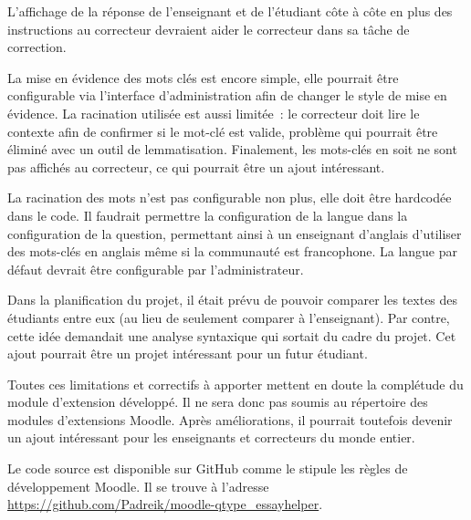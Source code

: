 \begin{conclusion}

L'affichage de la réponse de l'enseignant et de l'étudiant côte à côte en plus des instructions au correcteur devraient aider le correcteur dans sa tâche de correction.

La mise en évidence des mots clés est encore simple, elle pourrait être configurable via l'interface d'administration afin de changer le style de mise en évidence.
La racination utilisée est aussi limitée~: le correcteur doit lire le contexte afin de confirmer si le mot-clé est valide, problème qui pourrait être éliminé avec un outil de lemmatisation.
Finalement, les mots-clés en soit ne sont pas affichés au correcteur, ce qui pourrait être un ajout intéressant.

La racination des mots n'est pas configurable non plus, elle doit être \og hardcodée \fg{} dans le code.
Il faudrait permettre la configuration de la langue dans la configuration de la question, permettant ainsi à un enseignant d'anglais d'utiliser des mots-clés en anglais même si la communauté est francophone.
La langue par défaut devrait être configurable par l'administrateur.

Dans la planification du projet, il était prévu de pouvoir comparer les textes des étudiants entre eux (au lieu de seulement comparer à l'enseignant).
Par contre, cette idée demandait une analyse syntaxique qui sortait du cadre du projet.
Cet ajout pourrait être un projet intéressant pour un futur étudiant.

Toutes ces limitations et correctifs à apporter mettent en doute la complétude du module d'extension développé.
Il ne sera donc pas soumis au répertoire des modules d'extensions Moodle.
Après améliorations, il pourrait toutefois devenir un ajout intéressant pour les enseignants et correcteurs du monde entier.

Le code source est disponible sur GitHub comme le stipule les règles de développement Moodle.
Il se trouve à l'adresse \url{https://github.com/Padreik/moodle-qtype_essayhelper}.

\end{conclusion}
